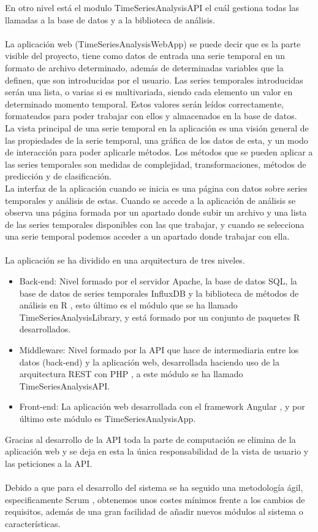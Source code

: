 \documentclass[14pt]{extarticle}
\theoremstyle{definition}
\theoremstyle{remark}
\begin{document}
En otro nivel está el modulo TimeSeriesAnalysisAPI el cuál gestiona todas las llamadas a la base de datos y a la biblioteca de análisis.\\\\
La aplicación web (TimeSeriesAnalysisWebApp) se puede decir que es la parte visible del proyecto, tiene como datos de entrada una serie temporal en un formato de archivo determinado, además de determinadas variables que la definen, que son introducidas por el usuario. Las series temporales introducidas serán una lista, o varias si es multivariada, siendo cada elemento un valor en determinado momento temporal. Estos valores serán leídos correctamente, formateados para poder trabajar con ellos y almacenados en la base de datos.\\
La vista principal de una serie temporal en la aplicación es una visión general de las propiedades de la serie temporal, una gráfica de los datos de esta, y un modo de interacción para poder aplicarle métodos. Los métodos que se pueden aplicar a las series temporales son medidas de complejidad, transformaciones, métodos de predicción y de clasificación.\\
La interfaz de la aplicación cuando se inicia es una página con datos sobre series temporales y análisis de estas. Cuando se accede a la aplicación de análisis se observa una página formada por un apartado donde subir un archivo y una lista de las series temporales disponibles con las que trabajar, y cuando se selecciona una serie temporal podemos acceder a un apartado donde trabajar con ella.\\\\La aplicación se ha dividido en una arquitectura de tres niveles.
\begin{itemize}
	\item Back-end: Nivel formado por el servidor Apache, la base de datos SQL, la base de datos de series temporales InfluxDB \cite{web:influxdb} y la biblioteca de métodos de análisis en R \cite{wiki:project_r}, esto último es el módulo que se ha llamado TimeSeriesAnalysisLibrary, y está formado por un conjunto de paquetes R desarrollados.
	\item Middleware: Nivel formado por la API que hace de intermediaria entre los datos (back-end) y la aplicación web, desarrollada haciendo uso de la arquitectura REST con PHP \cite{wiki:rest}, a este módulo se ha llamado TimeSeriesAnalysisAPI.
	\item Front-end: La aplicación web desarrollada con el framework Angular \cite{web:angular_google}, y por último este módulo es TimeSeriesAnalysisApp.
\end{itemize}
Gracias al desarrollo de la API toda la parte de computación se elimina de la aplicación web y se deja en esta la única responsabilidad de la vista de usuario y las peticiones a la API.\\\\
Debido a que para el desarrollo del sistema se ha seguido una metodología ágil, especificamente Scrum \cite{wiki:scrum}, obtenemos unos costes mínimos frente a los cambios de requisitos, además de una gran facilidad de añadir nuevos módulos al sistema o características.
\end{document}
